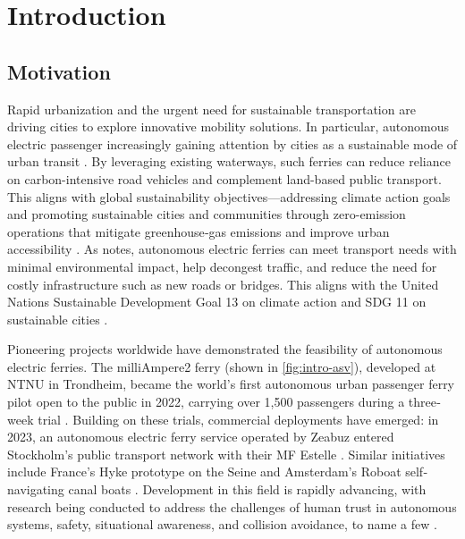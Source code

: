 
\chapter{Introduction}


\section{Motivation}

Rapid urbanization and the urgent need for sustainable transportation are driving cities to explore innovative mobility solutions. In particular, autonomous electric passenger increasingly gaining attention by cities as a sustainable mode of urban transit \citep{Alsos2024}. By leveraging existing waterways, such ferries can reduce reliance on carbon-intensive road vehicles and complement land-based public transport. 
This aligns with global sustainability objectives---addressing climate action goals and promoting sustainable cities and communities through zero-emission operations that mitigate greenhouse‐gas emissions and improve urban accessibility \citep{dnvAutonomousUrban}. 
As \citet{dnvAutonomousUrban} notes, autonomous electric ferries can meet transport needs with minimal environmental impact, help decongest traffic, and reduce the need for costly infrastructure such as new roads or bridges. This aligns with the United Nations Sustainable Development Goal 13 on climate action and SDG 11 on sustainable cities \citep{UN2024}.

Pioneering projects worldwide have demonstrated the feasibility of autonomous electric ferries. The milliAmpere2 ferry (shown in \cref{fig:intro-asv}), developed at NTNU in Trondheim, became the world’s first autonomous urban passenger ferry pilot open to the public in 2022, carrying over 1,500 passengers during a three‐week trial \citep{Alsos2024}. Building on these trials, commercial deployments have emerged: in 2023, an autonomous electric ferry service operated by Zeabuz entered Stockholm’s public transport network with their MF Estelle \citep{Alsos2024}. Similar initiatives include France’s Hyke prototype on the Seine and Amsterdam’s Roboat self‐navigating canal boats \citep{Alsos2024}. Development in this field is rapidly advancing, with research being conducted to address the challenges of human trust in autonomous systems, safety, situational awareness, and collision avoidance, to name a few \citep{Eide2025}.

